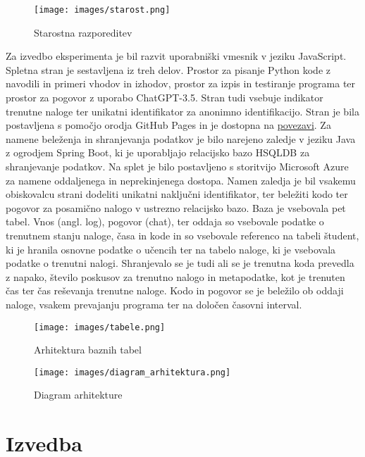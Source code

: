 \documentclass[a4paper,12pt,openright]{book}
\begin{document}
\begin{figure}[H]
    \centering
    \texttt{[image: images/starost.png]}
    \caption{Starostna razporeditev}
    \label{fig:ages}
\end{figure}

Za izvedbo eksperimenta je bil razvit uporabniški vmesnik v jeziku JavaScript. Spletna stran je sestavljena iz treh delov. Prostor za pisanje Python kode z navodili in primeri vhodov in izhodov, prostor za izpis in testiranje programa ter prostor za pogovor z uporabo ChatGPT-3.5. Stran tudi vsebuje indikator trenutne naloge ter unikatni identifikator za anonimno identifikacijo. Stran je bila postavljena s pomočjo orodja GitHub Pages in je dostopna na \href{https://spin311.github.io/diploma/}{povezavi}.
Za namene beleženja in shranjevanja podatkov je bilo narejeno zaledje v jeziku Java z ogrodjem Spring Boot, ki je uporabljajo relacijsko bazo HSQLDB za shranjevanje podatkov. Na splet je bilo postavljeno s storitvijo Microsoft Azure za namene oddaljenega in neprekinjenega dostopa. Namen zaledja je bil vsakemu obiskovalcu strani dodeliti unikatni naključni identifikator, ter beležiti kodo ter pogovor za posamično nalogo v ustrezno relacijsko bazo. Baza je vsebovala pet tabel. Vnos (angl. log), pogovor (chat), ter oddaja so vsebovale podatke o trenutnem stanju naloge, časa in kode in so vsebovale referenco na tabeli študent, ki je hranila osnovne podatke o učencih ter na tabelo naloge, ki je vsebovala podatke o trenutni nalogi. Shranjevalo se je tudi ali se je trenutna koda prevedla z napako, število poskusov za trenutno nalogo in metapodatke, kot je trenuten čas ter čas reševanja trenutne naloge. Kodo in pogovor se je beležilo ob oddaji naloge, vsakem prevajanju programa ter na določen časovni interval.

\begin{figure}[H]
    \centering
    \texttt{[image: images/tabele.png]}
    \caption{Arhitektura baznih tabel}
    \label{fig:enter-label}
\end{figure}

\begin{figure}[H]
    \centering
    \texttt{[image: images/diagram\_arhitektura.png]}
    \caption{Diagram arhitekture}
    \label{fig:enter-label}
\end{figure}
\section{Izvedba}
\end{document}

